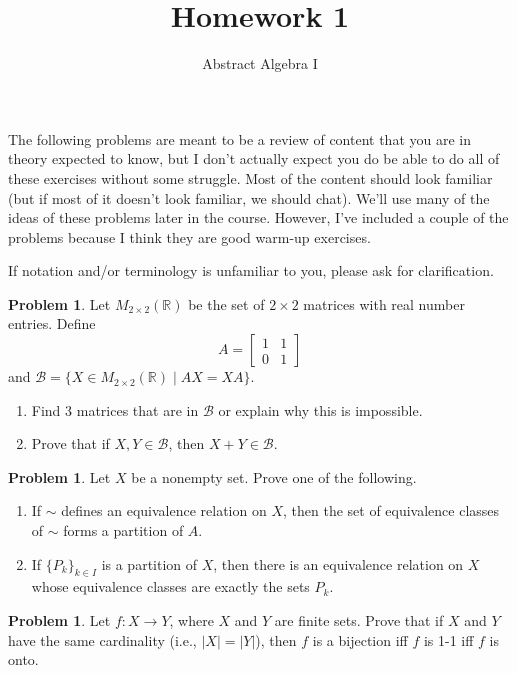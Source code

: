 \documentclass[11pt]{scrartcl}
\theoremstyle{definition}
\newtheorem{problem}[theorem]{Problem}
\begin{document}
\title{Homework 1}
\subtitle{Abstract Algebra I}
\date{}

\maketitle
\thispagestyle{fancy}

The following problems are meant to be a review of content that you are in theory expected to know, but I don't actually expect you do be able to do all of these exercises without some struggle.  Most of the content should look familiar (but if most of it doesn't look familiar, we should chat).  We'll use many of the ideas of these problems later in the course.  However, I've included a couple of the problems because I think they are good warm-up exercises.

If notation and/or terminology is unfamiliar to you, please ask for clarification.

\begin{problem}
Let $M_{2\times 2}(\mathbb{R})$ be the set of $2\times 2$ matrices with real number entries.  Define
\[
A=\begin{bmatrix}
1 & 1\\
0 & 1
\end{bmatrix}
\]
and $\mathcal{B}=\{X\in M_{2\times 2}(\mathbb{R})\mid AX=XA\}$.
\begin{enumerate}[label=\rm{(\alph*)}]
\item Find 3 matrices that are in $\mathcal{B}$ or explain why this is impossible.
\item Prove that if $X,Y\in\mathcal{B}$, then $X+Y\in\mathcal{B}$.
\end{enumerate}
\end{problem}

\begin{problem}
Let $X$ be a nonempty set.  Prove one of the following.
\begin{enumerate}[label=\rm{(\alph*)}]
\item If $\sim$ defines an equivalence relation on $X$, then the set of equivalence classes of $\sim$ forms a partition of $A$.
\item If $\{P_k\}_{k\in I}$ is a partition of $X$, then there is an equivalence relation on $X$ whose equivalence classes are exactly the sets $P_k$.
\end{enumerate}
\end{problem}

\begin{problem}
Let $f:X\to Y$, where $X$ and $Y$ are finite sets. Prove that if $X$ and $Y$ have the same cardinality (i.e., $|X|=|Y|$), then $f$ is a bijection iff $f$ is 1-1 iff $f$ is onto.
\end{problem}
\end{document}
